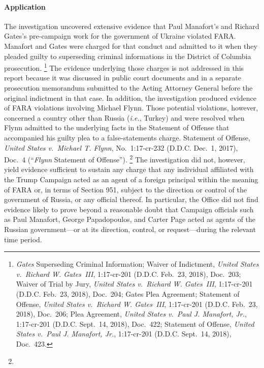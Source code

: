 \paragraph{Application}
The investigation uncovered extensive evidence that Paul Manafort's and Richard Gates's pre-campaign work for the government of Ukraine violated FARA\null.
Manafort and Gates were charged for that conduct and admitted to it when they pleaded guilty to superseding criminal informations in the District of Columbia prosecution.%
\footnote{\textit{Gates} Superseding Criminal Information;
Waiver of Indictment, \textit{United States v.\ Richard W. Gates~III}, 1:17-cr-201 (D.D.C. Feb.~23, 2018), Doc.~203;
Waiver of Trial by Jury, \textit{United States v.\ Richard W. Gates~III}, 1:17-cr-201 (D.D.C. Feb.~23, 2018), Doc.~204;
Gates Plea Agreement;
Statement of Offense, \textit{United States v.\ Richard W. Gates~III}, 1:17-cr-201 (D.D.C. Feb.~23, 2018), Doc.~206;
Plea Agreement, \textit{United States v.\ Paul J. Manafort, Jr.}, 1:17-cr-201 (D.D.C. Sept.~14, 2018), Doc.~422;
Statement of Offense, \textit{United States v.\ Paul J. Manafort, Jr.}, 1:17-cr-201 (D.D.C. Sept.~14, 2018), Doc.~423.}
The evidence underlying those charges is not addressed in this report because it was discussed in public court documents and in a separate prosecution memorandum submitted to the Acting Attorney General before the original indictment in that case.
In addition, the investigation produced evidence of FARA violations involving Michael Flynn.
Those potential violations, however, concerned a country other than Russia (\textit{i.e.}, Turkey) and were resolved when Flynn admitted to the underlying facts in the Statement of Offense that accompanied his guilty plea to a false-statements charge.
Statement of Offense, \textit{United States v.\ Michael T. Flynn}, No.~1:17-cr-232 (D.D.C. Dec.~1, 2017), Doc.~4 (``\textit{Flynn} Statement of Offense'').%
\footnote{}
The investigation did not, however, yield evidence sufficient to sustain any charge that any individual affiliated with the Trump Campaign acted as an agent of a foreign principal within the meaning of FARA or, in terms of Section 951, subject to the direction or control of the government of Russia, or any official thereof.
In particular, the Office did not find evidence likely to prove beyond a reasonable doubt that Campaign officials such as Paul Manafort, George Papadopoulos, and Carter Page acted as agents of the Russian government---or at its direction, control, or request---during the relevant time period.%
